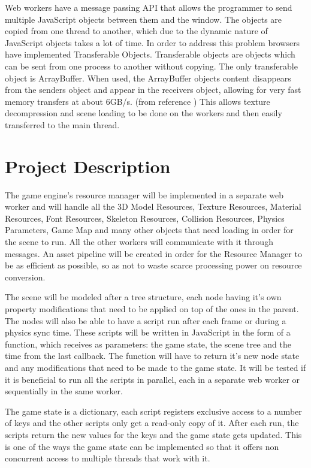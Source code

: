 Web workers have a message passing API that allows the programmer to send multiple JavaScript objects between them and the window. The objects are copied from one thread to another, which due to the dynamic nature of JavaScript objects takes a lot of time. In order to address this problem browsers have implemented Transferable Objects. Transferable objects are objects which can be sent from one process to another without copying. The only transferable object is ArrayBuffer. When used, the ArrayBuffer objects content disappears from the senders object and appear in the receivers object, allowing for very fast memory transfers at about 6GB/s. (from reference \cite{bidelman11}) This allows texture decompression and scene loading to be done on the workers and then easily transferred to the main thread.



\section{Project Description}
\label{proj-desc}

The game engine's resource manager will be implemented in a separate web worker and will handle all the 3D Model Resources, Texture Resources, Material Resources, Font Resources, Skeleton Resources, Collision Resources, Physics Parameters, Game Map and many other objects that need loading in order for the scene to run. All the other workers will communicate with it through messages. An asset pipeline will be created in order for the Resource Manager to be as efficient as possible, so as not to waste scarce processing power on resource conversion.

The scene will be modeled after a tree structure, each node having it's own property modifications that need to be applied on top of the ones in the parent. The nodes will also be able to have a script run after each frame or during a physics sync time. These scripts will be written in JavaScript in the form of a function, which receives as parameters: the game state, the scene tree and the time from the last callback. The function will have to return it's new node state and any modifications that need to be made to the game state. It will be tested if it is beneficial to run all the scripts in parallel, each in a separate web worker or sequentially in the same worker.


The game state is a dictionary, each script registers exclusive access to a number of keys and the other scripts only get a read-only copy of it. After each run, the scripts return the new values for the keys and the game state gets updated. This is one of the ways the game state can be implemented so that it offers non concurrent access to multiple threads that work with it.


